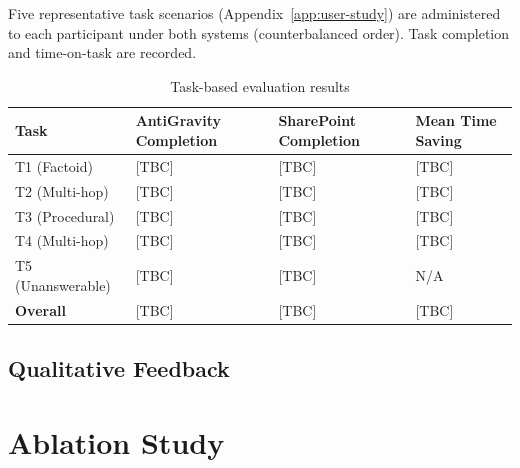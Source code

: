 Five representative task scenarios (Appendix~\ref{app:user-study}) are administered to each participant under both systems (counterbalanced order). Task completion and time-on-task are recorded.

\begin{table}[H]
\centering
\caption{Task-based evaluation results}
\label{tab:task-eval}
\begin{tabularx}{\textwidth}{@{}lXXX@{}}
\toprule
\textbf{Task} & \textbf{AntiGravity Completion} & \textbf{SharePoint Completion} & \textbf{Mean Time Saving} \\
\midrule
T1 (Factoid) & [TBC] & [TBC] & [TBC] \\
T2 (Multi-hop) & [TBC] & [TBC] & [TBC] \\
T3 (Procedural) & [TBC] & [TBC] & [TBC] \\
T4 (Multi-hop) & [TBC] & [TBC] & [TBC] \\
T5 (Unanswerable) & [TBC] & [TBC] & N/A \\
\midrule
\textbf{Overall} & [TBC] & [TBC] & [TBC] \\
\bottomrule
\end{tabularx}
\end{table}


\subsection{Qualitative Feedback}


\section{Ablation Study}
\label{sec:eval-ablation}

